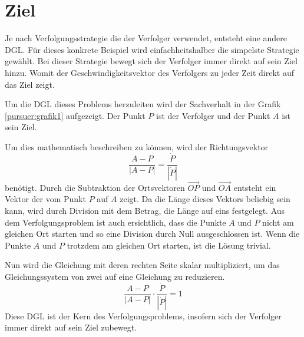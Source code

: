 %
%
%
\section{Ziel
\label{lambertw:section:teil1}}






Je nach Verfolgungsstrategie die der Verfolger verwendet, entsteht eine andere DGL.
Für dieses konkrete Beispiel wird einfachheitshalber die simpelste Strategie gewählt.
Bei dieser Strategie bewegt sich der Verfolger immer direkt auf sein Ziel hinzu.
Womit der Geschwindigkeitsvektor des Verfolgers zu jeder Zeit direkt auf das Ziel zeigt.

Um die DGL dieses Problems herzuleiten wird der Sachverhalt in der Grafik \eqref{pursuer:grafik1} aufgezeigt.
Der Punkt $P$ ist der Verfolger und der Punkt $A$ ist sein Ziel.

Um dies mathematisch beschreiben zu können, wird der Richtungsvektor
\begin{equation}
    \frac{A-P}{|A-P|}
    =
    \frac{\dot{P}}{|\dot{P}|}
\end{equation}
benötigt. Durch die Subtraktion der Ortsvektoren $\overrightarrow{OP}$ und $\overrightarrow{OA}$ entsteht ein Vektor der vom Punkt $P$ auf $A$ zeigt.
Da die Länge dieses Vektors beliebig sein kann, wird durch Division mit dem Betrag, die Länge auf eins festgelegt.
Aus dem Verfolgungsproblem ist auch ersichtlich, dass die Punkte $A$ und $P$ nicht am gleichen Ort starten und so eine Division durch Null ausgeschlossen ist.
Wenn die Punkte $A$ und $P$ trotzdem am gleichen Ort starten, ist die Lösung trivial.

Nun wird die Gleichung mit deren rechten Seite skalar multipliziert, um das Gleichungssystem von zwei auf eine Gleichung zu reduzieren.
\begin{equation}
    \label{pursuer:pursuerDGL}
    \frac{A-P}{|A-P|}\cdot \frac{\dot{P}}{|\dot{P}|}
    =
    1
\end{equation}
Diese DGL ist der Kern des Verfolgungsproblems, insofern sich der Verfolger immer direkt auf sein Ziel zubewegt.


